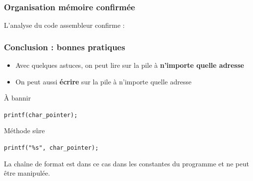 \documentclass{beamer}
\begin{document}
\begin{frame}[fragile]
\frametitle{Organisation mémoire confirmée}

L'analyse du code assembleur confirme :

\begin{center}
\end{center}

\end{frame}


\begin{frame}
\frametitle{Conclusion : bonnes pratiques}

\begin{itemize}
\item Avec quelques astuces, on peut lire sur la pile à \textbf{n'importe quelle adresse}
\item On peut aussi \textbf{écrire} sur la pile à n'importe quelle adresse
\end{itemize}

\begin{alertblock}{À bannir}
\centerline{\texttt{printf(char\_pointer);}}
\end{alertblock}

\begin{exampleblock}{Méthode sûre}
\centerline{\texttt{printf("\%s", char\_pointer);}}
\end{exampleblock}

La chaîne de format est dans ce cas dans les constantes du programme et ne peut être manipulée.

\end{frame}
\end{document}
